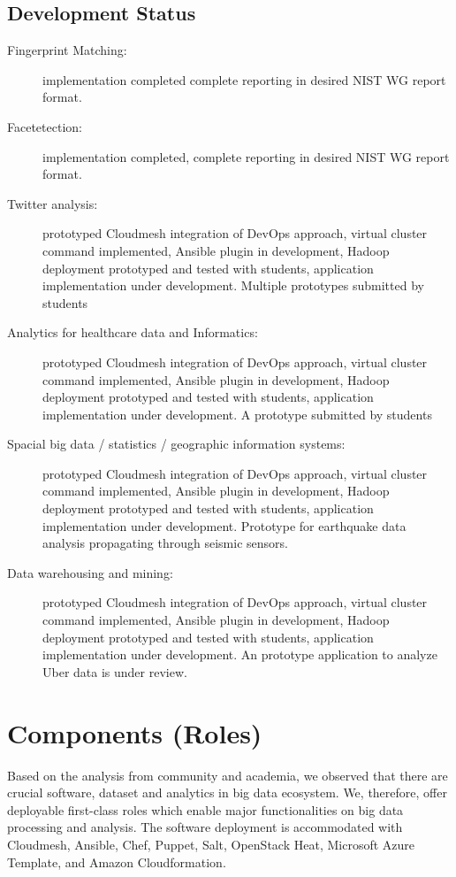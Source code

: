 \documentclass[9pt,twocolumn,twoside]{styles/osajnl}
\begin{document}
\subsection{Development Status}

\begin{description}
\item [Fingerprint Matching:] implementation completed  complete reporting in
  desired NIST WG report format.
\item [Facetetection:] implementation completed, complete reporting in
  desired NIST WG report format.
\item [Twitter analysis:] prototyped Cloudmesh integration of DevOps
  approach, virtual cluster command implemented, Ansible plugin in
  development, Hadoop deployment prototyped and tested with students,
  application implementation under development. Multiple prototypes
  submitted by students
\item [Analytics for healthcare data and Informatics:]
prototyped Cloudmesh integration of DevOps
  approach, virtual cluster command implemented, Ansible plugin in
  development, Hadoop deployment prototyped and tested with students,
  application implementation under development. A prototype submitted
  by students
\item [Spacial big data / statistics / geographic information
  systems:] prototyped Cloudmesh integration of DevOps approach,
  virtual cluster command implemented, Ansible plugin in development,
  Hadoop deployment prototyped and tested with students, application
  implementation under development. Prototype for earthquake data
  analysis propagating through seismic sensors.
\item [Data warehousing and mining:]
prototyped Cloudmesh integration of DevOps
  approach, virtual cluster command implemented, Ansible plugin in
  development, Hadoop deployment prototyped and tested with students,
  application implementation under development. An prototype
  application to analyze Uber data is under review.
\end{description}


\section{Components (Roles)}

Based on the analysis from community and academia, we observed that
there are crucial software, dataset and analytics in big data
ecosystem. We, therefore, offer deployable first-class roles which
enable major functionalities on big data processing and analysis. The
software deployment is accommodated with Cloudmesh, Ansible, Chef,
Puppet, Salt, OpenStack Heat, Microsoft Azure Template, and Amazon
Cloudformation.
\end{document}
